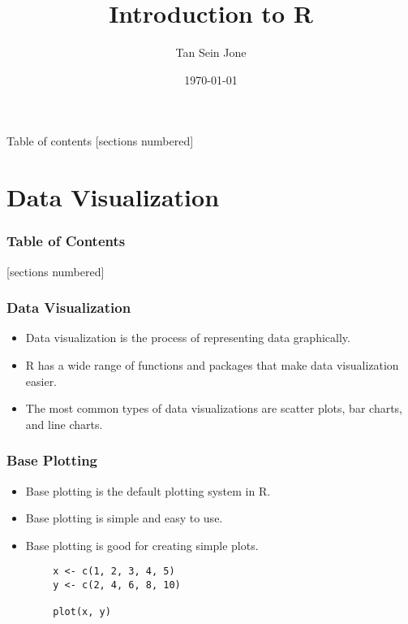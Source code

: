 \documentclass[serif, 9pt, aspectratio=32]{beamer}
\title{Introduction to R}
\date{\today}
\author{Tan Sein Jone}
\institute{University of British Columbia}
\begin{document}
\maketitle

\begin{frame}{Table of contents}
    [sections numbered]
    \tableofcontents[hideallsubsections]
\end{frame}

\section{Data Visualization}

\begin{frame}
    \frametitle{Table of Contents}
    [sections numbered]
    \tableofcontents[currentsection]
\end{frame}

\begin{frame}
    \centering
    \frametitle{Data Visualization}
    \begin{itemize}
        \setlength{\itemsep}{2em}
        \item Data visualization is the process of representing data graphically.
        \item R has a wide range of functions and packages that make data visualization easier.
        \item The most common types of data visualizations are scatter plots, bar charts, and line charts.
    \end{itemize}
\end{frame}

\begin{frame}
    \centering
    \frametitle{Base Plotting}
    \begin{itemize}
        \setlength{\itemsep}{2em}
        \item Base plotting is the default plotting system in R.
        \item Base plotting is simple and easy to use.
        \item Base plotting is good for creating simple plots.
    \end{itemize}
\end{frame}

\begin{frame}[fragile]
    \begin{lstlisting}
        x <- c(1, 2, 3, 4, 5)
        y <- c(2, 4, 6, 8, 10)

        plot(x, y)
    \end{lstlisting}
\end{frame}
\end{document}
